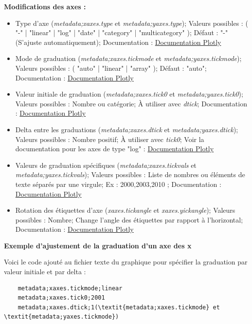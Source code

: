 \documentclass[11pt]{article}
\begin{document}
\textbf{Modifications des axes :}
\begin{itemize}
    \item Type d'axe (\textit{metadata;xaxes.type} et \textit{metadata;yaxes.type}); Valeurs possibles : ( "-" | "linear" | "log" | "date" | "category" | "multicategory" ); Défaut : "-" (S'ajuste automatiquement); Documentation : \href{https://plotly.com/python/reference/layout/xaxis/#layout-xaxis-type}{Documentation Plotly}
    \item Mode de graduation (\textit{metadata;xaxes.tickmode} et \textit{metadata;yaxes.tickmode}); Valeurs possibles : ( "auto" | "linear" | "array" ); Défaut : "auto"; Documentation : \href{https://plotly.com/python/reference/layout/xaxis/#layout-xaxis-minor-tickmode}{Documentation Plotly}
    \item Valeur initiale de graduation (\textit{metadata;xaxes.tick0} et \textit{metadata;yaxes.tick0}); Valeurs possibles : Nombre ou catégorie; À utiliser avec \textit{dtick}; Documentation : \href{https://plotly.com/python/reference/layout/xaxis/#layout-xaxis-tick0}{Documentation Plotly}
    \item Delta entre les graduations (\textit{metadata;xaxes.dtick} et \textit{metadata;yaxes.dtick}); Valeurs possibles : Nombre positif; À utiliser avec \textit{tick0}; Voir la documentation pour les axes de type "log" : \href{https://plotly.com/python/reference/layout/xaxis/#layout-xaxis-dtick}{Documentation Plotly}
    \item Valeurs de graduation spécifiques (\textit{metadata;xaxes.tickvals} et \textit{metadata;yaxes.tickvals}); Valeurs possibles : Liste de nombres ou éléments de texte séparés par une virgule; Ex : 2000,2003,2010 ; Documentation : \href{https://plotly.com/python/reference/layout/xaxis/#layout-xaxis-minor-tickvals}{Documentation Plotly}
    \item Rotation des étiquettes d'axe (\textit{xaxes.tickangle} et \textit{xaxes.yickangle}); Valeurs possibles : Nombre; Change l'angle des étiquettes par rapport à l'horizontal; Documentation : \href{https://plotly.com/python/reference/layout/xaxis/#layout-xaxis-tickangle}{Documentation Plotly} 
\end{itemize}

\pagebreak
\textbf{Exemple d'ajustement de la graduation d'un axe des x}

Voici le code ajouté au fichier texte du graphique pour spécifier la graduation par valeur initiale et par delta :

\begin{lstlisting}
    metadata;xaxes.tickmode;linear
    metadata;xaxes.tick0;2001
    metadata;xaxes.dtick;1(\textit{metadata;xaxes.tickmode} et \textit{metadata;yaxes.tickmode})
\end{lstlisting}
\end{document}
